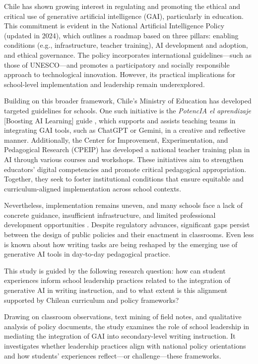\documentclass[english]{textolivre}
\begin{document}
Chile has shown growing interest in regulating and promoting the ethical and critical use of generative artificial intelligence (GAI), particularly in education. This commitment is evident in the National Artificial Intelligence Policy \cite{minciencia2021politica}(updated in 2024), which outlines a roadmap based on three pillars: enabling conditions (e.g., infrastructure, teacher training), AI development and adoption, and ethical governance. The policy incorporates international guidelines—such as those of UNESCO—and promotes a participatory and socially responsible approach to technological innovation. However, its practical implications for school-level implementation and leadership remain underexplored.

Building on this broader framework, Chile’s Ministry of Education has developed targeted guidelines for schools. One such initiative is the \textit{PotencIA el aprendizaje} [Boosting AI Learning] guide \cite{mineducchile2025potencia}, which supports and assists teaching teams in integrating GAI tools, such as ChatGPT or Gemini, in a creative and reflective manner. Additionally, the Center for Improvement, Experimentation, and Pedagogical Research (CPEIP) has developed a national teacher training plan in AI through various courses and workshops. These initiatives aim to strengthen educators’ digital competencies and promote critical pedagogical appropriation. Together, they seek to foster institutional conditions that ensure equitable and curriculum-aligned implementation across school contexts.

Nevertheless, implementation remains uneven, and many schools face a lack of concrete guidance, insufficient infrastructure, and limited professional development opportunities \cite{mineduc2023chatgpt,gobiernochile2024enia}. Despite regulatory advances, significant gaps persist between the design of public policies and their enactment in classrooms. Even less is known about how writing tasks are being reshaped by the emerging use of generative AI tools in day-to-day pedagogical practice.

This study is guided by the following research question: how can student experiences inform school leadership practices related to the integration of generative AI in writing instruction, and to what extent is this alignment supported by Chilean curriculum and policy frameworks?

Drawing on classroom observations, text mining of field notes, and qualitative analysis of policy documents, the study examines the role of school leadership in mediating the integration of GAI into secondary-level writing instruction. It investigates whether leadership practices align with national policy orientations and how students’ experiences reflect—or challenge—these frameworks.
\end{document}
